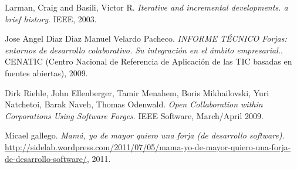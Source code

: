 \documentclass[a4paper, 12pt]{book}
\begin{document}

\begin{comment}
    Referenciar bibliografía: reference 1 ~\cite{New-commercial-OSS-standford-2010}.
\end{comment}

\begin{thebibliography}{25}


 Larman, Craig and Basili, Victor R. \textit{Iterative and incremental developments. a brief history}. IEEE, 2003.


 Jose Angel Diaz Diaz Manuel Velardo Pacheco. \textit{INFORME TÉCNICO Forjas: entornos de desarrollo colaborativo. Su integración en el ámbito empresarial.}. CENATIC (Centro Nacional de Referencia de Aplicación de las TIC basadas en fuentes abiertas), 2009.

 Dirk Riehle, John Ellenberger, Tamir Menahem, Boris Mikhailovski, Yuri Natchetoi, Barak Naveh, Thomas Odenwald. \textit{Open Collaboration within Corporations Using Software Forges}. IEEE Software, March/April 2009.

 Micael gallego. \textit{Mamá, yo de mayor quiero una forja (de desarrollo software)}. \url{http://sidelab.wordpress.com/2011/07/05/mama-yo-de-mayor-quiero-una-forja-de-desarrollo-software/}, 2011.

\end{thebibliography}
\end{document}
